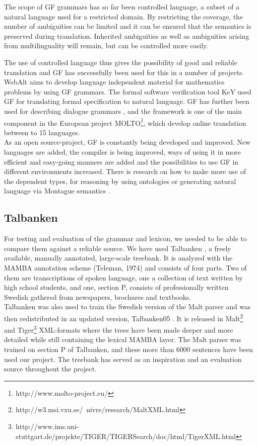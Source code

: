 \documentclass[runningheads,a4paper]{llncs}
\begin{document}
The scope of GF grammars has so far been controlled language, a subset of a
natural language used for a restricted domain. By
restricting the coverage, the number of ambiguities
can be limited and it can be ensured that the semantics is preserved during
translation. Inherited ambiguities as well as ambiguities arising from multilinguality will
remain, but can be controlled more easily. 

The use of controlled language thus gives the possibility of good and reliable
translation and GF has successfully been used for this in a number of projects.
WebAlt \cite{webalt} aims to develop language independent
material for mathematics problems by using GF grammars.
The formal software verification tool
KeY \cite{key} used GF for translating formal specification to
natural language.
GF has further been used for describing dialogue grammars \cite{talk}, and
the framework is one of the main component in the
European project MOLTO\footnote{http://www.molto-project.eu/}, which develop
online translation between to 15 languages.\\

As an open source-project, GF is constantly being developed and improved. New
languages are added, the compiler is being improved, ways of using it in more 
efficient and easy-going manners are added
and the possibilities to use GF in different environments
increased. There is research on how to make more use of the dependent
types, for reasoning by using ontologies \cite{ontologies2} or generating natural
language via Montague semantics \cite{montague}.




\subsection{Talbanken}

\label{sec:talbanken}
For testing and evaluation of the grammar and lexicon, we needed to be able to
compare them against a reliable source.
We have used Talbanken \cite{talbanken},
a freely available, manually annotated, large-scale treebank.
It is analyzed with the MAMBA annotation scheme (Teleman, 1974) and 
consists of four
parts. Two of them are transcriptions of spoken language, one a collection of
text written by high school students, and one, section P,
consists of professionally written Swedish gathered from newspapers, brochures and textbooks.
\\
\noindent Talbanken was also used to train the Swedish version of the Malt parser \cite{malt}
and was then redistributed in an updated version,
Talbanken05 \cite{talbanken05}.
It is released in Malt\footnote{http://w3.msi.vxu.se/~nivre/research/MaltXML.html} 
and Tiger\footnote{http://www.ims.uni-stuttgart.de/projekte/TIGER/TIGERSearch/doc/html/TigerXML.html}
XML-formats
where the trees have been made deeper and more detailed while still containing
the lexical MAMBA layer. 
The Malt parser was trained on section P of Talbanken, and these
more than 6000 sentences have been used our project. 
The treebank has served as an inspiration and an evaluation source throughout the
project.
\end{document}

